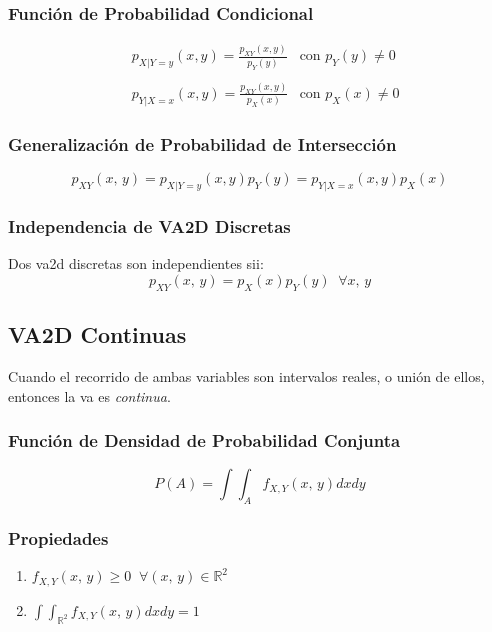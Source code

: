 \documentclass{article}
\newcommand{\comma}{,\,}                                %
\newcommand{\reales}{\mathbb{R}}                        %
\begin{document}
\subsubsection{Función de Probabilidad Condicional}
\begin{equation*}
    \begin{array}{lcc}
     & p_{X|Y=y}(x,y) = \frac{p_{XY}(x,y)}{p_Y(y)}  &\text{con } p_Y(y) \neq 0\\
     \\
     & p_{Y|X=x}(x,y) = \frac{p_{XY}(x,y)}{p_X(x)} &\text{con } p_X(x) \neq 0
\end{array}
\end{equation*}

\subsubsection{Generalización de Probabilidad de Intersección}
\begin{equation*}
    p_{XY}(x \comma y) = p_{X|Y=y}(x,y)p_Y(y) = p_{Y|X=x}(x,y)p_X(x)
\end{equation*}

\subsubsection{Independencia de VA2D Discretas}
Dos va2d discretas son independientes sii:
\begin{equation*}
    p_{XY}(x \comma y) = p_X(x) p_Y(y) \;\; \forall x \comma y
\end{equation*}

\subsection{VA2D Continuas}
Cuando el recorrido de ambas variables son intervalos reales, o unión de ellos, entonces la va es \emph{continua}.

\subsubsection{Función de Densidad de Probabilidad Conjunta}
\begin{equation*}
    P(A) = \int \int_A f_{X , Y} (x \comma y) dx dy
\end{equation*}
\subsubsection*{Propiedades}
\begin{enumerate}
    \item $f_{X , Y} (x \comma y) \geq 0 \;\; \forall (x \comma y) \in \reales^2$
    \item $\int \int_{\reales^2} f_{X , Y} (x \comma y) dx dy = 1$
\end{enumerate}
\end{document}
